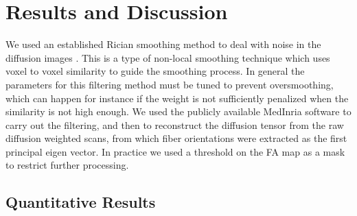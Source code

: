 \newcommand{\degree}{^{\circ}}

\chapter{Results and Discussion}

We used an established Rician smoothing method to deal with noise in the diffusion images \cite{wiest2008rician}. This is a type of non-local smoothing technique which uses voxel to voxel similarity to guide the smoothing process. In general the parameters for this filtering method must be tuned to prevent oversmoothing, which can happen for instance if the weight is not sufficiently penalized when the similarity is not high enough. We used the publicly available MedInria software to carry out the filtering, and then to reconstruct the diffusion tensor from the raw diffusion weighted scans, from which fiber orientations were extracted as the first principal eigen vector. In practice we used a threshold on the FA map as a mask to restrict further processing.

\section{Quantitative Results}

